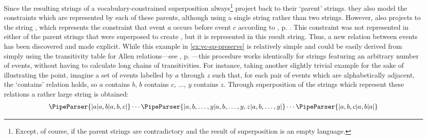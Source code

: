 \documentclass[a4paper,12pt,leqno,twoside]{article}
\newcommand{\vph}[1]{\vphantom{#1}}
\newcommand{\ebox}[1]{\fbox{$\vph{'(),}#1$}}
\newcommand{\nbBefore}[2]{\ebox{#1}\ebox{}\ebox{#2}}
\newcommand{\Before}[2]{\ebox{}\nbBefore{#1}{#2}\ebox{}}
\newcommand{\EventString}[1]{%
	\renewcommand*{\do}[1]{\ebox{##1}}%
	\PipeParser{#1}%
}
\begin{document}
Since the resulting strings of a vocabulary-constrained superposition always\footnote{Except, of course, if the parent strings are contradictory and the result of superposition is an empty language.} project back to their `parent' strings. they also model the constraints which are represented by each of these parents, although using a single string rather than two strings. However, \EventString{{}|a|{}|b|{}|c|{}} also projects to the string \Before{a}{c}, which represents the constraint that event $a$ occurs before event $c$ according to , p. \pageref{tab:allen-rels-strings}. This constraint was not represented in either of the parent strings that were superposed to create \EventString{{}|a|{}|b|{}|c|{}}, but it is represented in this result string. Thus, a new relation between events has been discovered and made explicit. While this example in \cref{ex:vc-sp-preserve} is relatively simple and could be easily derived from simply using the transitivity table for Allen relations---see , p. \pageref{tab:allen-trans-table}---this procedure works identically for strings featuring an arbitrary number of events, without having to calculate long chains of transitivities. For instance, taking another slightly trivial example for the sake of illustrating the point, imagine a set of events labelled by $a$ through $z$ such that, for each pair of events which are alphabetically adjacent, the `contains' relation holds, so $a$ contains $b$, $b$ contains $c$, ..., $y$ contains $z$. Through superposition of the strings which represent these relations a rather large string is obtained:
\begin{align}
	\EventString{{}|a|a,b|a,b,c|}\cdots\EventString{|a,b,\ldots,y|a,b,\ldots,y,z|a,b,\ldots,y|}\cdots\EventString{|a,b,c|a,b|a|{}}\label{ex:a-z-string}
\end{align}
\end{document}
